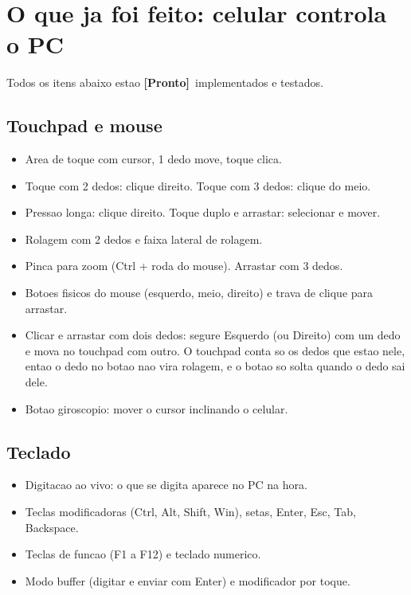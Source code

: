 \documentclass[11pt,a4paper]{article}
\newcommand{\feito}{\textcolor{laranja}{\textbf{[Pronto]}}\ }
\begin{document}
\section{O que ja foi feito: celular controla o PC}
\label{sec:feito}

Todos os itens abaixo estao \feito implementados e testados.

\subsection{Touchpad e mouse}
\begin{itemize}
  \item Area de toque com cursor, 1 dedo move, toque clica.
  \item Toque com 2 dedos: clique direito. Toque com 3 dedos: clique do meio.
  \item Pressao longa: clique direito. Toque duplo e arrastar: selecionar e mover.
  \item Rolagem com 2 dedos e faixa lateral de rolagem.
  \item Pinca para zoom (Ctrl + roda do mouse). Arrastar com 3 dedos.
  \item Botoes fisicos do mouse (esquerdo, meio, direito) e trava de clique para arrastar.
  \item Clicar e arrastar com dois dedos: segure Esquerdo (ou Direito) com um dedo e mova no
  touchpad com outro. O touchpad conta so os dedos que estao nele, entao o dedo no botao nao
  vira rolagem, e o botao so solta quando o dedo sai dele.
  \item Botao giroscopio: mover o cursor inclinando o celular.
\end{itemize}

\subsection{Teclado}
\begin{itemize}
  \item Digitacao ao vivo: o que se digita aparece no PC na hora.
  \item Teclas modificadoras (Ctrl, Alt, Shift, Win), setas, Enter, Esc, Tab, Backspace.
  \item Teclas de funcao (F1 a F12) e teclado numerico.
  \item Modo buffer (digitar e enviar com Enter) e modificador por toque.
\end{itemize}
\end{document}
